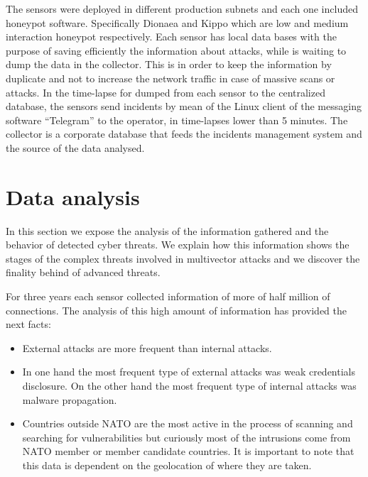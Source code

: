 \documentclass[a4paper]{llncs}
\begin{document}
The sensors were deployed in different production subnets and each one included honeypot software. Specifically Dionaea\cite{dionaea} and Kippo\cite{kippo} which are low and medium interaction honeypot respectively. Each sensor has local data bases with the purpose of saving efficiently the information about attacks, while is waiting to dump the data in the collector. This is  in order to keep the information by duplicate and not to increase the network traffic in case of massive scans or attacks. In the time-lapse for dumped from each sensor to the centralized database, the sensors send incidents by mean of the Linux client of the messaging software ``Telegram''\cite{telegram-messenger} to the operator, in time-lapses lower than 5 minutes. The collector is a corporate database that feeds the incidents management system and the source of the data analysed.
	
	
\section{Data analysis}
\label{sec:analysis}
In this section we expose the analysis of the information gathered and the behavior of detected cyber threats. We explain how this information shows the stages of the complex threats involved in multivector attacks and we discover the finality behind of advanced threats.

For three years each sensor collected information of more of half million of connections. The analysis of this high amount of information has provided the next facts:
\begin{itemize}
	\item External attacks are more frequent than internal attacks.
	\item In one hand the most frequent type of external attacks was weak credentials disclosure. On the other hand the most frequent type of internal attacks was malware propagation.
	\item Countries outside NATO are the most active in the process of scanning and searching for vulnerabilities but curiously most of the intrusions come from NATO member or member candidate countries. It is important to note that this data is dependent on the geolocation of where they are taken.
\end{itemize}
\end{document}
